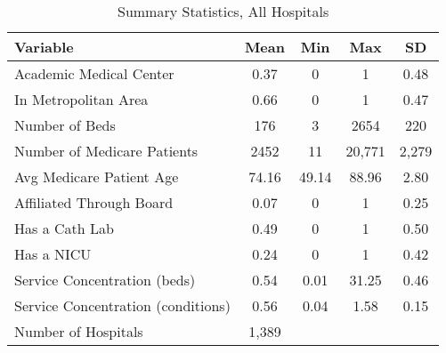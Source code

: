 \begin{table}[ht!]

\caption{Summary Statistics, All Hospitals\label{all_sumstats}}
\centering
\begin{tabular}[t]{lcccc}
\toprule
Variable & Mean & Min & Max & SD\\
\midrule
Academic Medical Center & 0.37 & 0 & 1 & 0.48\\
In Metropolitan Area & 0.66 & 0 & 1 & 0.47\\
Number of Beds & 176 & 3 & 2654 & 220\\
Number of Medicare Patients & 2452 & 11 & 20,771 & 2,279\\
Avg Medicare Patient Age & 74.16 & 49.14 & 88.96 & 2.80\\
\addlinespace
Affiliated Through Board & 0.07 & 0 & 1 & 0.25\\
\addlinespace
Has a Cath Lab & 0.49 & 0 & 1 & 0.50\\
Has a NICU & 0.24 & 0 & 1 & 0.42\\
Service Concentration (beds) & 0.54 & 0.01 & 31.25 & 0.46\\
Service Concentration (conditions) & 0.56 & 0.04 & 1.58 & 0.15\\
\addlinespace
Number of Hospitals & 1,389 &  &  & \\
\bottomrule
\end{tabular}
\end{table}
